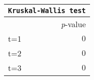 \begin{tabular}{l r}
\toprule
\multicolumn{2}{c}{\texttt{Kruskal-Wallis test}}\\
\midrule
& \textit{p}-value \\
\midrule
t=1 & $0$\\
t=2 & $0$\\
t=3 & $0$\\
\bottomrule
\end{tabular}
